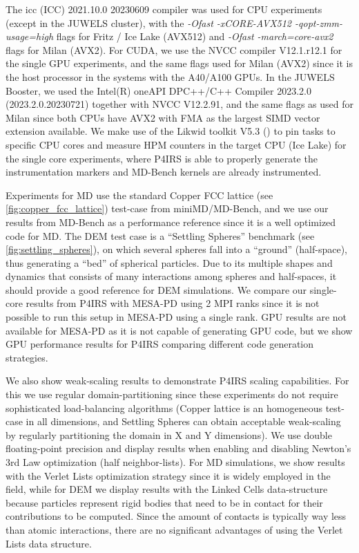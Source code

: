 \documentclass[Afour,sageh,times]{sagej}
\begin{document}
The icc (ICC) 2021.10.0 20230609 compiler was used for CPU experiments (except in the JUWELS cluster), with the \emph{-Ofast -xCORE-AVX512 -qopt-zmm-usage=high} flags for Fritz / Ice Lake (AVX512) and \emph{-Ofast -march=core-avx2} flags for Milan (AVX2).
For CUDA, we use the NVCC compiler V12.1.r12.1 for the single GPU experiments, and the same flags used for Milan (AVX2) since it is the host processor in the systems with the A40/A100 GPUs.
In the JUWELS Booster, we used the Intel(R) oneAPI DPC++/C++ Compiler 2023.2.0 (2023.2.0.20230721) together with NVCC V12.2.91, and the same flags as used for Milan since both CPUs have AVX2 with FMA as the largest SIMD vector extension available.
We make use of the Likwid toolkit V5.3 (\cite{likwid}) to pin tasks to specific CPU cores and measure HPM counters in the target CPU (Ice Lake) for the single core experiments, where P4IRS is able to properly generate the instrumentation markers and MD-Bench kernels are already instrumented.

Experiments for \ac{MD} use the standard Copper FCC lattice (see \autoref{fig:copper_fcc_lattice}) test-case from miniMD/MD-Bench, and we use our results from MD-Bench as a performance reference since it is a well optimized code for \ac{MD}.
The \ac{DEM} test case is a ``Settling Spheres'' benchmark (see \autoref{fig:settling_spheres}), on which several spheres fall into a ``ground'' (half-space), thus generating a ``bed'' of spherical particles.
Due to its multiple shapes and dynamics that consists of many interactions among spheres and half-spaces, it should provide a good reference for DEM simulations.
We compare our single-core results from P4IRS with MESA-PD using 2 MPI ranks since it is not possible to run this setup in MESA-PD using a single rank.
GPU results are not available for MESA-PD as it is not capable of generating GPU code, but we show GPU performance results for P4IRS comparing different code generation strategies.

We also show weak-scaling results to demonstrate P4IRS scaling capabilities.
For this we use regular domain-partitioning since these experiments do not require sophisticated load-balancing algorithms (Copper lattice is an homogeneous test-case in all dimensions, and Settling Spheres can obtain acceptable weak-scaling by regularly partitioning the domain in X and Y dimensions).
We use double floating-point precision and display results when enabling and disabling Newton's 3rd Law optimization (half neighbor-lists).
For \ac{MD} simulations, we show results with the Verlet Lists optimization strategy since it is widely employed in the field, while for \ac{DEM} we display results with the Linked Cells data-structure because particles represent rigid bodies that need to be in contact for their contributions to be computed.
Since the amount of contacts is typically way less than atomic interactions, there are no significant advantages of using the Verlet Lists data structure.
\end{document}

